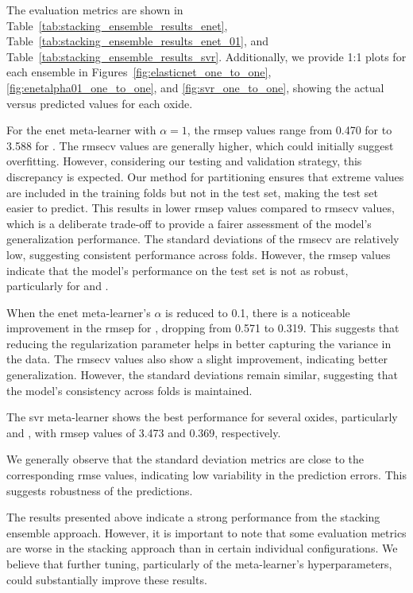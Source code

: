 The evaluation metrics are shown in Table~\ref{tab:stacking_ensemble_results_enet}, Table~\ref{tab:stacking_ensemble_results_enet_01}, and Table~\ref{tab:stacking_ensemble_results_svr}.
Additionally, we provide 1:1 plots for each ensemble in Figures~\ref{fig:elasticnet_one_to_one}, \ref{fig:enetalpha01_one_to_one}, and \ref{fig:svr_one_to_one}, showing the actual versus predicted values for each oxide.

For the \gls{enet} meta-learner with $\alpha = 1$, the \gls{rmsep} values range from 0.470 for  to 3.588 for .
The \gls{rmsecv} values are generally higher, which could initially suggest overfitting.
However, considering our testing and validation strategy, this discrepancy is expected.
Our method for partitioning ensures that extreme values are included in the training folds but not in the test set, making the test set easier to predict.
This results in lower \gls{rmsep} values compared to \gls{rmsecv} values, which is a deliberate trade-off to provide a fairer assessment of the model's generalization performance.
The standard deviations of the \gls{rmsecv} are relatively low, suggesting consistent performance across folds.
However, the \gls{rmsep} values indicate that the model's performance on the test set is not as robust, particularly for  and .

When the \gls{enet} meta-learner's $\alpha$ is reduced to 0.1, there is a noticeable improvement in the \gls{rmsep} for , dropping from 0.571 to 0.319.
This suggests that reducing the regularization parameter helps in better capturing the variance in the data.
The \gls{rmsecv} values also show a slight improvement, indicating better generalization.
However, the standard deviations remain similar, suggesting that the model's consistency across folds is maintained.

The \gls{svr} meta-learner shows the best performance for several oxides, particularly  and , with \gls{rmsep} values of 3.473 and 0.369, respectively.

We generally observe that the standard deviation metrics are close to the corresponding \gls{rmse} values, indicating low variability in the prediction errors.
This suggests robustness of the predictions.

The results presented above indicate a strong performance from the stacking ensemble approach.
However, it is important to note that some evaluation metrics are worse in the stacking approach than in certain individual configurations.
We believe that further tuning, particularly of the meta-learner's hyperparameters, could substantially improve these results.

